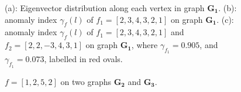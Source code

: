 \begin{figure}[t]
	\centering


	\caption{(a): Eigenvector distribution along each vertex in graph $\mathbf{G_1}$.  (b): anomaly index $\gamma_f(l)$ of $f_1=[2,3,4,3,2,1]$ on graph $\mathbf{G_1}$. (c): anomaly index $\gamma_f(l)$ of $f_1=[2,3,4,3,2,1]$  and $f_2=[2,2,-3,4,3,1]$ on graph $\mathbf{G_1}$, where $\gamma_{f_1}=0.905$, and $\gamma_{f_1}=0.073$, labelled in red ovals.}
	\label{fig:f_on_g2}
\end{figure}






\begin{figure}[t]
	\centering
	\caption{$f=[1,2,5,2]$ on two graphs $\mathbf{G_2}$ and $\mathbf{G_3}$.}
	\label{fig:f_on_g}
\end{figure}

